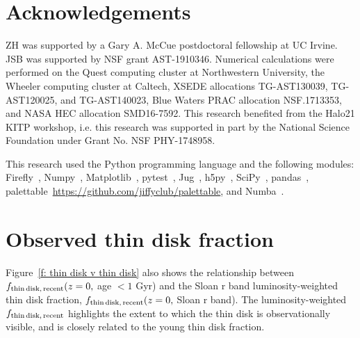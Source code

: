 \documentclass[fleqn,usenatbib]{mnras}
\begin{document}
\section*{Acknowledgements}

ZH was supported by a Gary A. McCue postdoctoral fellowship at UC Irvine.
JSB was supported by NSF grant AST-1910346.
Numerical calculations were performed on the Quest computing cluster at Northwestern University, the Wheeler computing cluster at Caltech, XSEDE allocations TG-AST130039, TG-AST120025, and TG-AST140023, Blue Waters PRAC allocation NSF.1713353, and NASA HEC allocation SMD16-7592.
This research benefited from the Halo21 KITP workshop, i.e. this research was supported in part by the National Science Foundation under Grant No. NSF PHY-1748958.

This research used the Python programming language and the following modules:
Firefly~\citep{Geller2018},
Numpy~\citep{Harris2020},
Matplotlib~\citep{Hunter2007},
pytest~\citep{pytest3.4},
Jug~\citep{Coelho2017},
h5py~\citep{h5py},
SciPy~\citep{Virtanen2020},
pandas~\citep{McKinney2010,Reback2020},
palettable~\url{https://github.com/jiffyclub/palettable},
and Numba~\citep{Lam2015}.









\appendix

\section{Observed thin disk fraction}
\label{s: appendix-sloan thin disk fraction}
Figure~\ref{f: thin disk v thin disk} also shows the relationship between $f_{\rm thin\,disk,\,recent}(z=0,$ age $<1$ Gyr) and the Sloan r band luminosity-weighted thin disk fraction, $f_{\rm thin\,disk,\,recent}(z=0,$ Sloan r band).
The luminosity-weighted $f_{\rm thin\,disk,\,recent}$ highlights the extent to which the thin disk is observationally visible, and is closely related to the young thin disk fraction.
\end{document}
